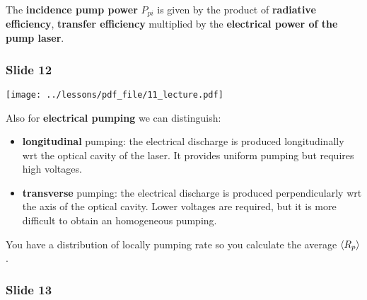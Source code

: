 \documentclass[../main/main.tex]{subfiles}
\begin{document}
The \textbf{incidence pump power} \( P_{pi} \) is given by the product of \textbf{radiative efficiency}, \textbf{transfer efficiency} multiplied by the \textbf{electrical power of the pump laser}.

\subsubsection*{Slide 12}

\begin{minipage}[]{0.5\linewidth}
\centering
\texttt{[image: ../lessons/pdf\_file/11\_lecture.pdf]}
\end{minipage}
\hspace{0.3cm}\vspace{0.3cm}
\begin{minipage}[c]{0.47\linewidth}

Also for \textbf{electrical pumping} we can distinguish:

\begin{itemize}
\item \textbf{longitudinal} pumping: the electrical discharge is produced longitudinally wrt the optical cavity of the laser. It provides uniform pumping but requires high voltages.

\item \textbf{transverse} pumping: the electrical discharge is produced perpendicularly wrt the axis of the optical cavity. Lower voltages are required, but it is more difficult to obtain an homogeneous pumping.

\end{itemize}

You have a distribution of locally pumping rate so you calculate the average \( \expval{R_p}  \).

\end{minipage}

\subsubsection*{Slide 13}
\end{document}
